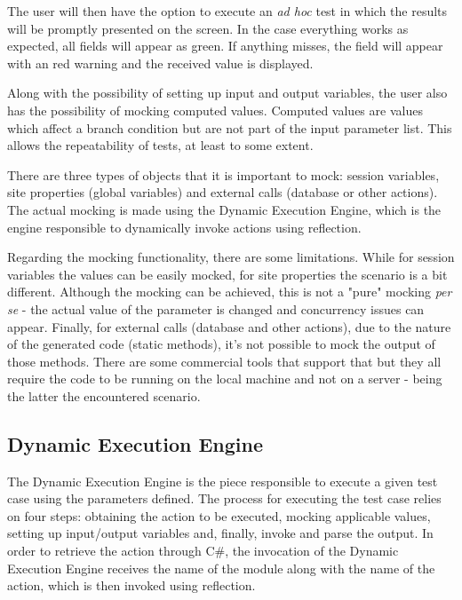\documentclass{sigchi}
\begin{document}
The user will then have the option to execute an \textit{ad hoc} test in which the results will be promptly presented on the screen. In the case everything works as expected, all fields will appear as green. If anything misses, the field will appear with an red warning and the received value is displayed.

Along with the possibility of setting up input and output variables, the user also has the possibility of mocking computed values. Computed values are values which affect a branch condition but are not part of the input parameter list. This allows the repeatability of tests, at least to some extent.

There are three types of objects that it is important to mock: session variables, site properties (global variables) and external calls (database or other actions). The actual mocking is made using the Dynamic Execution Engine, which is the engine responsible to dynamically invoke actions using reflection.

Regarding the mocking functionality, there are some limitations. While for session variables the values can be easily mocked, for site properties the scenario is a bit different. Although the mocking can be achieved, this is not a "pure" mocking \textit{per se} - the actual value of the parameter is changed and concurrency issues can appear. Finally, for external calls (database and other actions), due to the nature of the generated code (static methods), it's not possible to mock the output of those methods. There are some commercial tools that support that but they all require the code to be running on the local machine and not on a server - being the latter the encountered scenario.

\subsection{Dynamic Execution Engine}
The Dynamic Execution Engine is the piece responsible to execute a given test case using the parameters defined. The process for executing the test case relies on four steps: obtaining the action to be executed, mocking applicable values, setting up input/output variables and, finally, invoke and parse the output.
In order to retrieve the action through C\#, the invocation of the Dynamic Execution Engine receives the name of the module along with the name of the action, which is then invoked using reflection.
\end{document}
